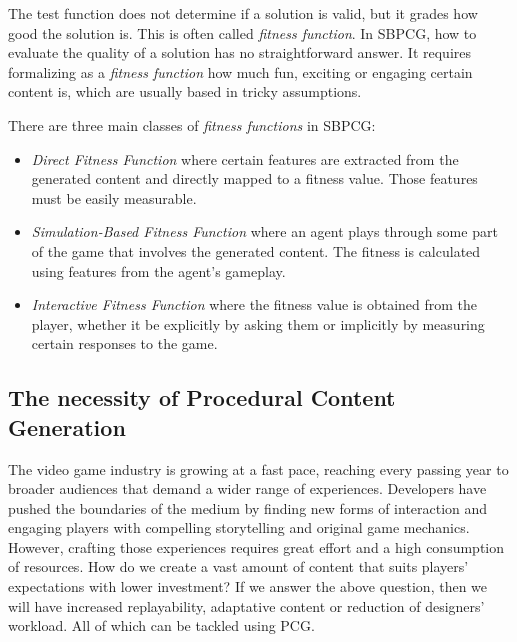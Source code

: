 The test function does not determine if a solution is valid, but it grades how good the solution is. This is often called \textit{fitness function}. In SBPCG, how to evaluate the quality of a solution has no straightforward answer. It requires formalizing as a \textit{fitness function} how much fun, exciting or engaging certain content is, which are usually based in tricky assumptions.


There are three main classes of \textit{fitness functions} in SBPCG\cite{togelius2010search}:

\begin{itemize}
	\item \textit{Direct Fitness Function} where certain features are extracted from the generated content and directly mapped to a fitness value. Those features must be easily measurable.
	\item \textit{Simulation-Based Fitness Function} where an agent plays through some part of the game that involves the generated content. The fitness is calculated using features from the agent's gameplay. 
	
	\item \textit{Interactive Fitness Function} where the fitness value is obtained from the player, whether it be explicitly by asking them or implicitly by measuring certain responses to the game. 
\end{itemize}


\subsection{The necessity of Procedural Content Generation}
The video game industry is growing at a fast pace, reaching every passing year to broader audiences that demand a wider range of experiences. Developers have pushed the boundaries of the medium by finding new forms of interaction and engaging players with compelling storytelling and original game mechanics. However, crafting those experiences  requires great effort and a high consumption of resources. How do we create a vast amount of content that suits players' expectations with lower investment? If we answer the above question, then we will have increased replayability, adaptative content or reduction of designers' workload. All of which can be tackled using PCG.\cite{togelius2016introduction}

